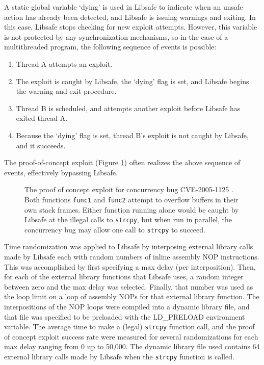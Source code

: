 \documentclass[letterpaper,twocolumn,10pt]{article}
\begin{document}
A static global variable `dying' is used in Libsafe to indicate when an unsafe action has already been detected, and Libsafe is issuing warnings and exiting.  In this case, Libsafe stops checking for new exploit attempts.  However, this variable is not protected by any synchronization mechanisms, so in the case of a multithreaded program, the following sequence of events is possible:
\begin{enumerate}
	\item Thread A attempts an exploit.
	\item The exploit is caught by Libsafe, the `dying' flag is set, and Libsafe begins the warning and exit procedure.
	\item Thread B is scheduled, and attempts another exploit before Libsafe has exited thread A.
	\item Because the `dying' flag is set, thread B's exploit is not caught by Libsafe, and it succeeds.
\end{enumerate}
The proof-of-concept exploit (Figure \ref{fig_poc}) often realizes the above sequence of events, effectively bypassing Libsafe.
\begin{figure}

\caption{The proof of concept exploit for concurrency bug CVE-2005-1125 \cite{CVE2005-1125}.  Both functions \texttt{func1} and \texttt{func2} attempt to overflow buffers in their own stack frames.  Either function running alone would be caught by Libsafe at the illegal calls to \texttt{strcpy}, but when run in parallel, the concurrency bug may allow one call to \texttt{strcpy} to succeed.}
\label{fig_poc}
\end{figure}
Time randomization was applied to Libsafe by interposing external library calls \cite{Conrad2009} made by Libsafe each with random numbers of inline assembly NOP instructions.  This was accomplished by first specifying a max delay (per interposition).  Then, for each of the external library functions that Libsafe uses, a random integer between zero and the max delay was selected.  Finally, that number was used as the loop limit on a loop of assembly NOPs for that external library function.  The interpositions of the NOP loops were compiled into a dynamic library file, and that file was specified to be preloaded with the LD\_PRELOAD environment variable.
The average time to make a (legal) \texttt{strcpy} function call, and the proof of concept exploit success rate were measured for several randomizations for each max delay ranging from 0 up to 50,000.  The dynamic library file used contains 64 external library calls made by Libsafe when the \texttt{strcpy} function is called.
\end{document}
